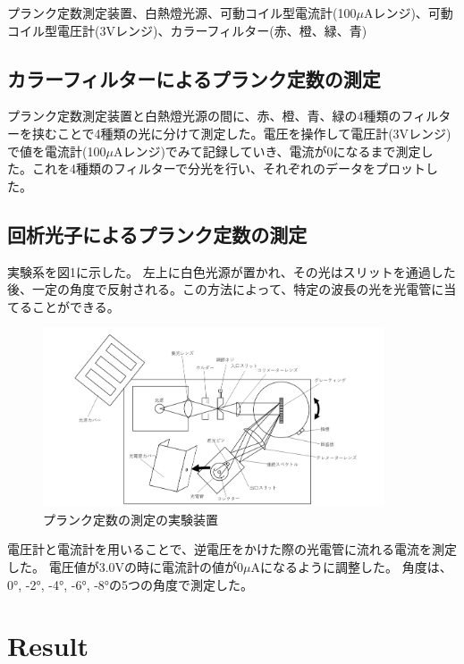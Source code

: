 \documentclass[a4paper,12pt]{jsarticle}
\begin{document}
プランク定数測定装置、白熱燈光源、可動コイル型電流計(100$\mu$Aレンジ)、可動コイル型電圧計(3Vレンジ)、カラーフィルター(赤、橙、緑、青)
\subsection{カラーフィルターによるプランク定数の測定}
プランク定数測定装置と白熱燈光源の間に、赤、橙、青、緑の4種類のフィルターを挟むことで4種類の光に分けて測定した。電圧を操作して電圧計(3Vレンジ)で値を電流計(100$\mu$Aレンジ)でみて記録していき、電流が0になるまで測定した。これを4種類のフィルターで分光を行い、それぞれのデータをプロットした。

\subsection{回析光子によるプランク定数の測定}
実験系を図1に示した。
左上に白色光源が置かれ、その光はスリットを通過した後、一定の角度で反射される。この方法によって、特定の波長の光を光電管に当てることができる。
\begin{figure}[H]
  \centering
  \includegraphics[width=0.9\textwidth]{figs/fig4.pdf}
  \caption{プランク定数の測定の実験装置}
\end{figure}
電圧計と電流計を用いることで、逆電圧をかけた際の光電管に流れる電流を測定した。
電圧値が3.0Vの時に電流計の値が0$\mu$Aになるように調整した。
角度は、0°, -2°, -4°, -6°, -8°の5つの角度で測定した。

\section{Result}
\end{document}
